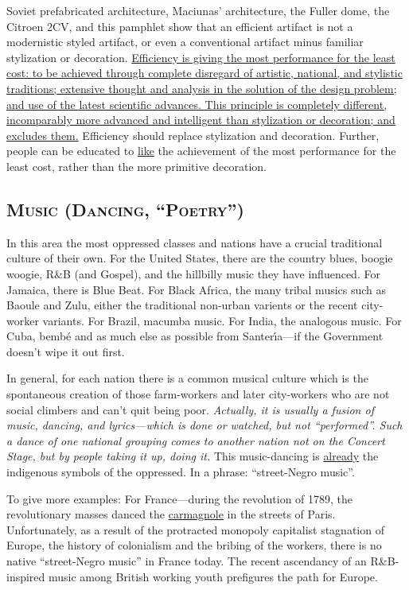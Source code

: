 Soviet prefabricated architecture, Maciunas' architecture, the Fuller 
dome, the Citroen 2CV, and this pamphlet show that an efficient artifact
is not a modernistic styled artifact, or even a conventional artifact minus
familiar stylization or decoration. \uline{Efficiency is giving the most performance
for the least cost: to be achieved through complete disregard of 
artistic, national, and stylistic traditions; extensive thought and analysis
in the solution of the design problem; and use of the latest scientific advances.
This principle is completely different, incomparably more advanced and 
intelligent than stylization or decoration; and excludes them.} Efficiency
should replace stylization and decoration. Further, people can be educated to
\uline{like} the achievement of the most performance for the least cost, rather than the more
primitive decoration. 

\subsection*{\textsc{Music (Dancing, \enquote{Poetry})}}

In this area the most oppressed classes and nations have a crucial traditional
culture of their own. For the United States, there are the country blues, 
boogie woogie, R\&B (and Gospel), and the hillbilly music they have influenced.
For Jamaica, there is Blue Beat. For Black Africa, the many tribal musics such
as Baoule and Zulu, either the traditional non-urban varients or the recent 
city-worker variants. For Brazil, macumba music. For India, the analogous music.
For Cuba, bemb\'{e} and as much else as possible from Santer\'{\i}a---if the Government
doesn't wipe it out first. 

In general, for each nation there is a common musical culture which is the
spontaneous creation of those farm-workers and later city-workers who are not
social climbers and can't quit being poor. \emph{Actually, it is usually a fusion of music, dancing, and lyrics---which is done or watched, but not \enquote{performed}. Such a dance of one national grouping comes to another nation not on the Concert Stage, but by people taking it up, doing it.} 
This music-dancing is \uline{already} the indigenous symbols of the oppressed.
In a phrase: \enquote{street-Negro music}. 

To give more examples: For France---during the revolution of 1789, the 
revolutionary masses danced the \uline{carmagnole} in the streets of Paris. Unfortunately,
as a result of the protracted monopoly capitalist stagnation of Europe,
the history of colonialism and the bribing of the workers, there is no native
\enquote{street-Negro music} in France today. The recent ascendancy of an R\&B-inspired
music among British working youth prefigures the path for Europe. 

